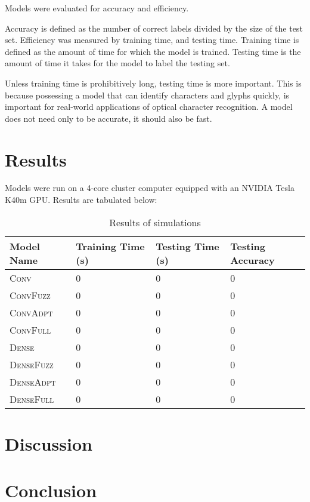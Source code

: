 \documentclass{article}
\begin{document}
Models were evaluated for accuracy and efficiency.

Accuracy is defined as the number of correct labels divided by the size of the test set.
Efficiency was measured by training time, and testing time.
Training time is defined as the amount of time for which the model is trained.
Testing time is the amount of time it takes for the model to label the testing set.

Unless training time is prohibitively long, testing time is more important.
This is because possessing a model that can identify characters and glyphs quickly,
is important for real-world applications of optical character recognition.
A model does not need only to be accurate, it should also be fast.

%

\section{Results}

Models were run on a 4-core cluster computer equipped with an NVIDIA Tesla K40m GPU.
Results are tabulated below:

\begin{table}
  \caption{Results of simulations}
  \label{tbl:results}
  \centering
  \begin{tabular}{llll}
    \toprule
    Model Name & Training Time (s) & Testing Time (s) & Testing Accuracy \\
    \midrule
    \textsc{Conv}         & 0 & 0 & 0 \\
    \textsc{ConvFuzz}     & 0 & 0 & 0 \\
    \textsc{ConvAdpt}     & 0 & 0 & 0 \\
    \textsc{ConvFull}     & 0 & 0 & 0 \\
    \textsc{Dense}        & 0 & 0 & 0 \\
    \textsc{DenseFuzz}    & 0 & 0 & 0 \\
    \textsc{DenseAdpt}    & 0 & 0 & 0 \\
    \textsc{DenseFull}    & 0 & 0 & 0 \\
    \bottomrule
  \end{tabular}
\end{table}

\section{Discussion}

\section{Conclusion}


\end{document}
